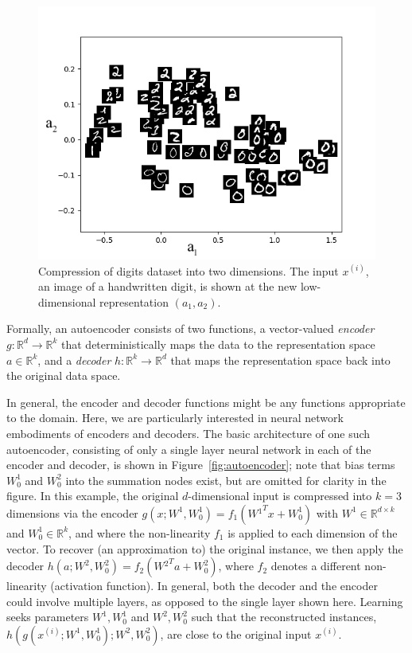 \begin{figure}[h!]
  \centering
  \includegraphics[width= .5\textwidth]{figures/autoencoder_mnist.png}
  \caption{\small Compression of digits dataset into two
    dimensions. The input $x^{(i)}$, an image of a handwritten
    digit, is shown at the new low-dimensional representation
    $(a_1,a_2)$.}
  \label{fig:illustration}
\end{figure}

Formally, an autoencoder consists of two functions, a vector-valued
\textit{encoder} $g : \mathbb{R}^d \rightarrow \mathbb{R}^k$ that
deterministically maps the data to the representation space $a \in
  \mathbb{R}^k$, and a \textit{decoder} $h : \mathbb{R}^k \rightarrow
  \mathbb{R}^d$ that maps the representation space back into the
original data space.

In general, the encoder and decoder functions might be any functions
appropriate to the domain. Here, we are particularly interested in
neural network embodiments of encoders and decoders.
The basic architecture of one such autoencoder, consisting of only a single
layer neural network in each of the encoder and decoder, is shown in
Figure~\ref{fig:autoencoder}; note that bias terms $W^1_0$ and $W^2_0$ into
the summation nodes exist, but are omitted for clarity in the figure.
In this example, the original
$d$-dimensional input is compressed into $k=3$ dimensions via the
encoder $g(x; W^1, W^1_0)=f_1(W{^1}^T x + W^1_0)$ with $W^1 \in
  \mathbb{R}^{d \times k}$ and $W^1_0 \in \mathbb{R}^k$,
and where the non-linearity $f_1$ is applied to each
dimension of the vector. To recover (an approximation to) the
original instance, we then apply the decoder $h(a; W^2, W^2_0) = f_2(W{^2}^T
  a + W^2_0)$, where $f_2$ denotes a different non-linearity (activation
function). In general, both the decoder and the encoder could involve
multiple layers, as opposed to the single layer shown here. Learning
seeks parameters $W^1, W^1_0$ and $W^2, W^2_0$ such that the reconstructed
instances, $h(g(x^{(i)}; W^{1}, W^1_0); W^{2}, W^2_0)$, are close to the original
input $x^{(i)}$.

